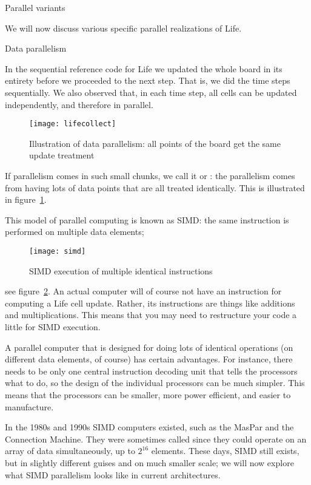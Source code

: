  {Parallel variants}

We will now discuss various specific parallel
realizations of Life.

 {Data parallelism}
\label{sec:simd}

In the sequential reference code for Life we
updated the whole board in its entirety before
we proceeded to the next step. That is, we did the time steps
sequentially. 
We also observed that, in each time step, all cells can be updated
independently, and therefore in parallel. 
\begin{figure}[ht]
  \texttt{[image: lifecollect]}
  \caption{Illustration of data parallelism: all points of the board get the same update treatment}
  \label{fig:lifecollect}
\end{figure}
If parallelism comes in
such small chunks, we call it  or
: the
parallelism comes from having lots of data points that are all treated
identically. 
This is illustrated in figure~\ref{fig:lifecollect}.

This model of parallel computing is known as \acf{SIMD}:
the same instruction is performed on multiple data elements;
\begin{figure}[ht]
  \texttt{[image: simd]}
  \caption{SIMD execution of multiple identical instructions}
  \label{fig:simd}
\end{figure}
see figure~\ref{fig:simd}.
An actual computer will of course not have an instruction for computing
a Life cell update. Rather, its instructions are things like additions and multiplications.
This means that you may need to restructure your code a little for \ac{SIMD}
execution.

A parallel computer that is designed for doing lots of identical 
operations (on different data elements, of course) has certain advantages.
For instance, there needs to be only one central 
instruction decoding unit that tells the processors what to do,
so the design of the individual processors 
can be much simpler. This means that the processors can be smaller,
more power efficient, and easier to manufacture.

In the 1980s and 1990s \ac{SIMD} computers existed, such as the MasPar
and the Connection Machine. They were sometimes called 
since they could operate on an array of data simultaneously,
up to $2^{16}$ elements.
These days, \ac{SIMD} still exists, but in slightly different guises
and on much smaller scale;
we will now explore what \ac{SIMD} parallelism looks like
in current architectures.

